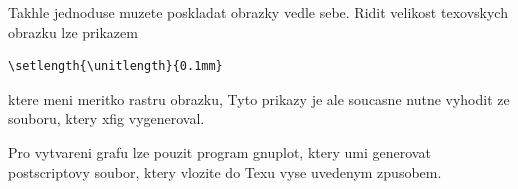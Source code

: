 \documentclass[a4paper]{article}
\begin{document}
Takhle jednoduse muzete poskladat obrazky vedle sebe.
Ridit velikost texovskych obrazku lze prikazem
\begin{verbatim}
\setlength{\unitlength}{0.1mm}
\end{verbatim}
ktere meni meritko rastru obrazku, Tyto prikazy je ale soucasne 
nutne vyhodit ze souboru, ktery xfig vygeneroval.

Pro vytvareni grafu lze pouzit program gnuplot, ktery umi generovat postscriptovy soubor, ktery vlozite
do Texu vyse uvedenym zpusobem.
\end{document}
